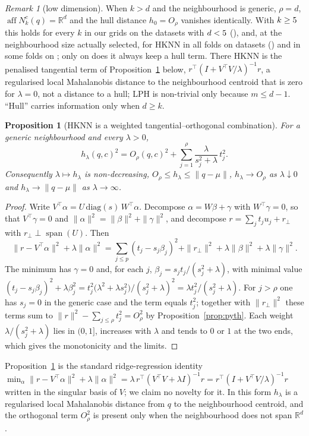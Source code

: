 \documentclass[10pt,a4paper]{article}
\theoremstyle{plain}
\newtheorem{proposition}[theorem]{Proposition}
\theoremstyle{definition}
\theoremstyle{remark}
\newtheorem{remark}[theorem]{Remark}
\newcommand{\R}{\mathbb{R}}
\newcommand{\Nk}{N_k^{c}(q)}
\newcommand{\aff}{\operatorname{aff}}
\newcommand{\meth}[1]{\textsf{#1}}
\begin{document}
\begin{remark}[low dimension]\label{rem:lowdim}
When $k>d$ and the neighbourhood is generic, $\rho=d$, $\aff\Nk=\R^d$ and the hull distance $h_0=O_\rho$ vanishes identically. With $k\ge5$ this holds for every $k$ in our grids on the \NLowDim{} datasets with $d<5$ (\LowDimList), and, at the neighbourhood size actually selected, for \meth{HKNN} in all folds on \NHknnKgtDAll{} datasets (\HknnKgtDAllList) and in some folds on \HknnKgtDSomeList; only on \HknnKgtDNoneList{} does it always keep a hull term. There \meth{HKNN} is the penalised tangential term of Proposition~\ref{prop:hknn} below, $r^{\top}(I+V^{\top}V/\lambda)^{-1}r$, a regularised local Mahalanobis distance to the neighbourhood centroid that is zero for $\lambda=0$, not a distance to a hull; \meth{LPH} is non-trivial only because $m\le d-1$. ``Hull'' carries information only when $d\ge k$.
\end{remark}

\begin{proposition}[HKNN is a weighted tangential--orthogonal combination]\label{prop:hknn}
For a generic neighbourhood and every $\lambda>0$,
\[
h_\lambda(q,c)^2=O_\rho(q,c)^2+\sum_{j=1}^{\rho}\frac{\lambda}{s_j^2+\lambda}\,t_j^2 .
\]
Consequently $\lambda\mapsto h_\lambda$ is non-decreasing, $O_\rho\le h_\lambda\le\|q-\mu\|$, $h_\lambda\to O_\rho$ as $\lambda\downarrow0$ and $h_\lambda\to\|q-\mu\|$ as $\lambda\to\infty$.
\end{proposition}
\begin{proof}
Write $V^{\top}\alpha=U\,\mathrm{diag}(s)\,W^{\top}\alpha$. Decompose $\alpha=W\beta+\gamma$ with $W^{\top}\gamma=0$, so that $V^{\top}\gamma=0$ and $\|\alpha\|^2=\|\beta\|^2+\|\gamma\|^2$, and decompose $r=\sum_j t_ju_j+r_\perp$ with $r_\perp\perp\operatorname{span}(U)$. Then
\[
\|r-V^{\top}\alpha\|^2+\lambda\|\alpha\|^2=\sum_{j\le p}(t_j-s_j\beta_j)^2+\|r_\perp\|^2+\lambda\|\beta\|^2+\lambda\|\gamma\|^2 .
\]
The minimum has $\gamma=0$ and, for each $j$, $\beta_j=s_jt_j/(s_j^2+\lambda)$, with minimal value $(t_j-s_j\beta_j)^2+\lambda\beta_j^2=t_j^2\big(\lambda^2+\lambda s_j^2\big)/(s_j^2+\lambda)^2=\lambda t_j^2/(s_j^2+\lambda)$. For $j>\rho$ one has $s_j=0$ in the generic case and the term equals $t_j^2$; together with $\|r_\perp\|^2$ these terms sum to $\|r\|^2-\sum_{j\le\rho}t_j^2=O_\rho^2$ by Proposition~\ref{prop:pyth}. Each weight $\lambda/(s_j^2+\lambda)$ lies in $(0,1]$, increases with $\lambda$ and tends to $0$ or $1$ at the two ends, which gives the monotonicity and the limits.
\end{proof}
\noindent Proposition~\ref{prop:hknn} is the standard ridge-regression identity $\min_\alpha\|r-V^{\top}\alpha\|^2+\lambda\|\alpha\|^2=\lambda\,r^{\top}(V^{\top}V+\lambda I)^{-1}r=r^{\top}(I+V^{\top}V/\lambda)^{-1}r$ written in the singular basis of $V$; we claim no novelty for it. In this form $h_\lambda$ is a regularised local Mahalanobis distance from $q$ to the neighbourhood centroid, and the orthogonal term $O_\rho^2$ is present only when the neighbourhood does not span $\R^d$.
\end{document}
